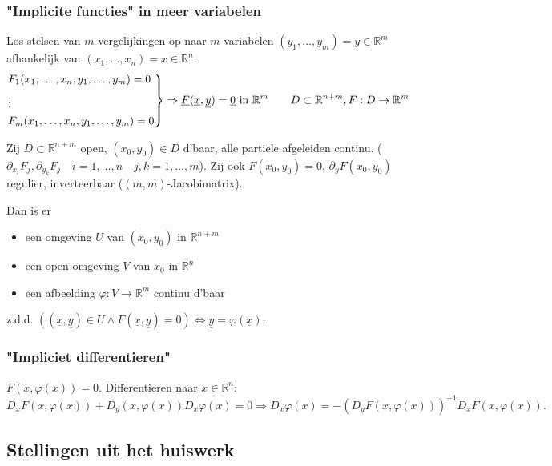 \documentclass[a4paper]{exam}
\theoremstyle{definition}
\newcommand{\reals}{\mathbb{R}}
\begin{document}
			
			\subsubsection{"Implicite functies" in meer variabelen}
				Los stelsen van $m$ vergelijkingen op naar $m$ variabelen $(y_1, \dots ,y_m) = y \in \reals^m$ afhankelijk van $ (x_1, \dots , x_n) = x \in \reals^n $.
				\[
				\begin{rcases*}
				F_1(x_1,\dots,x_n,y_1,\dots,y_m)=0 \\
				\vdots \\
				F_m(x_1,\dots,x_n,y_1,\dots,y_m)=0
				\end{rcases*} \Rightarrow \underline{F}(\underline{x},\underline{y})=\underline{0} \text{ in } \reals^m \qquad D \subset \reals^{n+m}, F: D \rightarrow \reals^m
				\]
				
				 Zij $ D\subset \reals^{n+m} $ open, $ (x_0, y_0) \in D $ d'baar, alle partiele afgeleiden continu. ($ \partial_{x_i}F_j , \partial_{y_k}F_j \quad i=1,\dots,n \quad j,k=1,\dots,m $). Zij ook $ F(x_0, y_0) = \underline{0}$, $ \partial_y F(x_0,y_0) $ regulier, inverteerbaar ($ (m,m) $-Jacobimatrix).
				
				Dan is er \begin{itemize}
					\item[] een omgeving $ U $ van $ (x_0,y_0) $ in $ \reals^{n+m} $
					\item[] een open omgeving $V$ van $x_0$ in $\reals^n$
					\item[] een afbeelding $ \varphi : V\rightarrow \reals^m $ continu d'baar 
				\end{itemize}
				z.d.d. $ ((\underline{x},\underline{y}) \in U \wedge F(\underline{x},\underline{y})=0) \Leftrightarrow \underline{y}=\varphi (\underline{x}). $
				
			\subsubsection{"Impliciet differentieren"}
				$ F(x,\varphi(x))=0 $. Differentieren naar $ x\in \reals^n $:
				\[ D_x F(x,\varphi(x)) + D_y (x,\varphi(x))D_x \varphi(x) = 0 \Rightarrow D_x \varphi(x) = -(D_y F(x,\varphi(x)))^{-1} D_x F(x,\varphi(x)). \]
				
		\subsection{Stellingen uit het huiswerk}
			
\end{document}

